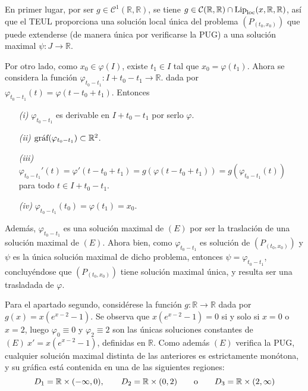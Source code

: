 \documentclass[11pt]{report}
\newcommand{\R}{\mathbb R}
\begin{document}
\vspace{4mm}

En primer lugar, por ser $g \in \mathcal{C}^1(\R,\R)$, se tiene $g \in \mathcal{C}(\R,\R)\cap \textup{Lip}_{\textup{loc}}(x,\R,\R)$, así que el TEUL proporciona una solución local única del problema $(P_{(t_0,x_0)})$ que puede extenderse (de manera única por verificarse la PUG) a una solución maximal $\psi \colon J \to \R$.

\vspace{2mm}

Por otro lado, como $x_0 \in \varphi(I)$, existe $t_1 \in I$ tal que $x_0=\varphi(t_1)$. Ahora se considera la función $\varphi_{t_0-t_1} \colon I+t_0-t_1 \to \R$. dada por $\varphi_{t_0-t_1}(t)=\varphi(t-t_0+t_1)$. Entonces
\begin{itemize}
    \item[\textit{(i)}] $\varphi_{t_0-t_1}$ es derivable en $I+t_0-t_1$ por serlo $\varphi$.
    \item[\textit{(ii)}] $\textup{gráf}(\varphi_{t_0-t_1}) \subset \R^2$.
    \item[\textit{(iii)}] ~$\varphi_{t_0-t_1}'(t)=\varphi'(t-t_0+t_1)=g(\varphi(t-t_0+t_1))=g(\varphi_{t_0-t_1}(t))$ para todo $t \in I+t_0-t_1$.
    \item[\textit{(iv)}] $\varphi_{t_0-t_1}(t_0)=\varphi(t_1)=x_0$.
\end{itemize}

Además, $\varphi_{t_0-t_1}$ es una solución maximal de $(E)$ por ser la traslación de una solución maximal de $(E)$. Ahora bien, como $\varphi_{t_0-t_1}$ es solución de $(P_{(t_0,x_0)})$ y $\psi$ es la única solución maximal de dicho problema, entonces $\psi =\varphi_{t_0-t_1}$, concluyéndose que $(P_{(t_0,x_0)})$ tiene solución maximal única, y resulta ser una trasladada de $\varphi$.

\vspace{2mm}

Para el apartado segundo, considérese la función $g \colon \R \to \R$ dada por $g(x)=x(e^{x-2}-1)$. Se observa que $x(e^{x-2}-1)=0$ si y solo si $x=0$ o $x=2$, luego $\varphi_0 \equiv 0$ y $\varphi_2 \equiv 2$ son las únicas soluciones constantes de $(E) \ x'=x(e^{x-2}-1)$, definidas en $\R$. Como además $(E)$ verifica la PUG, cualquier solución maximal distinta de las anteriores es estrictamente monótona, y su gráfica está contenida en una de las siguientes regiones:
\[D_1=\R \times (-\infty,0), \qquad D_2=\R \times (0,2) \qquad \textup{o} \qquad D_3= \R \times (2,\infty)\]
\end{document}
